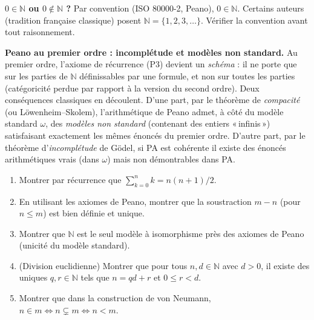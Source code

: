 \begin{mdframed}[style=cexbar]
  \textbf{$0 \in \mathbb{N}$ ou $0 \notin \mathbb{N}$ ?}\enspace%
  Par convention (ISO 80000-2, Peano), $0 \in \mathbb{N}$. Certains auteurs
  (tradition française classique) posent $\mathbb{N} = \{1,2,3,\ldots\}$.
  Vérifier la convention avant tout raisonnement.

  \smallskip\noindent
  \textbf{Peano au premier ordre : incomplétude et modèles non standard.}\enspace%
  Au premier ordre, l'axiome de récurrence (P3) devient un \emph{schéma} :
  il ne porte que sur les parties de $\mathbb{N}$ définissables par une formule,
  et non sur toutes les parties (catégoricité perdue par rapport à la version
  du second ordre). Deux conséquences classiques en découlent.
  D'une part, par le théorème de \emph{compacité} (ou Löwenheim--Skolem),
  l'arithmétique de Peano admet, à côté du modèle standard $\omega$, des
  \emph{modèles non standard} (contenant des entiers «\,infinis\,») satisfaisant
  exactement les mêmes énoncés du premier ordre.
  D'autre part, par le théorème d'\emph{incomplétude} de Gödel, si PA est
  cohérente il existe des énoncés arithmétiques vrais (dans $\omega$) mais
  non démontrables dans PA.
\end{mdframed}

\vspace{6pt}
\exolabel

\begin{mdframed}[style=exobar]
  \begin{enumerate}
    \item Montrer par récurrence que $\sum_{k=0}^{n} k = n(n+1)/2$.

    \item En utilisant les axiomes de Peano, montrer que la soustraction
          $m - n$ (pour $n \leq m$) est bien définie et unique.

    \item Montrer que $\mathbb{N}$ est le seul modèle à isomorphisme près
          des axiomes de Peano (unicité du modèle standard).

    \item (Division euclidienne) Montrer que pour tous $n,d \in \mathbb{N}$
          avec $d > 0$, il existe des uniques $q, r \in \mathbb{N}$ tels que
          $n = qd + r$ et $0 \leq r < d$.

    \item Montrer que dans la construction de von Neumann, $n \in m
          \Leftrightarrow n \subsetneq m \Leftrightarrow n < m$.
  \end{enumerate}
\end{mdframed}

